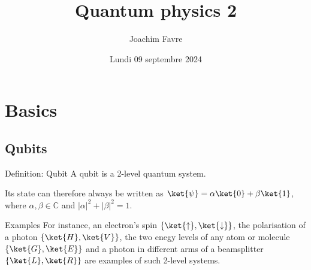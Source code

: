 \documentclass[a4paper]{article}
\title{Quantum physics 2}
\author{Joachim Favre}
\date{Lundi 09 septembre 2024}
\begin{document}
\maketitle


\section{Basics}
\subsection{Qubits}

\begin{parag}{Definition: Qubit}
    A qubit is a 2-level quantum system.

    Its state can therefore always be written as $\ket{\psi} = \alpha \ket{0} + \beta \ket{1}$, where $\alpha, \beta \in \mathbb{C}$ and $\left|\alpha\right|^2 + \left|\beta\right|^2 = 1$.

    \begin{subparag}{Examples}
        For instance, an electron's spin $\left\{\ket{\uparrow}, \ket{\downarrow}\right\}$, the polarisation of a photon $\left\{\ket{H}, \ket{V}\right\}$, the two enegy levels of any atom or molecule $\left\{\ket{G}, \ket{E}\right\}$ and a photon in different arms of a beamsplitter $\left\{\ket{L}, \ket{R}\right\}$ are examples of such 2-level systems.
    \end{subparag}
\end{parag}
\end{document}

